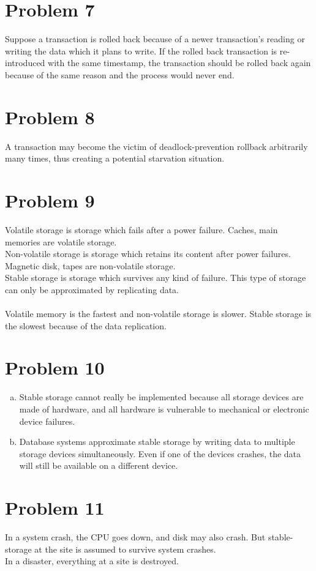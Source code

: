 \documentclass[a4paper,11pt]{article}
\begin{document}
\section*{Problem 7}
Suppose a transaction is rolled back because of a newer transaction's reading or
writing the data which it plans to write. If the rolled back transaction
is re-introduced with the same timestamp, the transaction should be rolled back again because of the same reason and the process would never end. 

\section*{Problem 8}
A transaction may become the victim of deadlock-prevention rollback arbitrarily many times, thus creating a potential starvation situation.

\section*{Problem 9}
Volatile storage is storage which fails after a power failure. Caches, main memories are volatile storage.\\
Non-volatile storage is storage which retains its content after power failures. Magnetic disk, tapes are non-volatile storage.\\
Stable storage is storage which survives any kind of failure. This type of storage can only be approximated by replicating data.\\~\\
Volatile memory is the fastest and non-volatile storage is slower. Stable storage is the slowest because of the data replication.

\section*{Problem 10}
\begin{enumerate}[a.]
\item 
Stable storage cannot really be implemented because all storage devices are made of hardware, and all hardware is vulnerable to mechanical or electronic device failures.
\item 
 Database systems approximate stable storage by writing data to multiple storage devices simultaneously. Even if one of the devices crashes, the data will still be available on a different device.
\end{enumerate}

\section*{Problem 11}
In a system crash, the CPU goes down, and disk may also crash. But stable-storage at the site is assumed to survive system crashes. \\
In a disaster, everything at a site is destroyed. 
\end{document}
